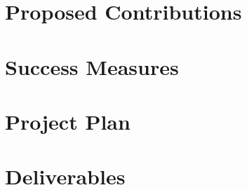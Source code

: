 \documentclass[11pt]{article}
\begin{document}
\section{Proposed Contributions}
\section{Success Measures}
\section{Project Plan}
\section{Deliverables}


    
    
\end{document}
